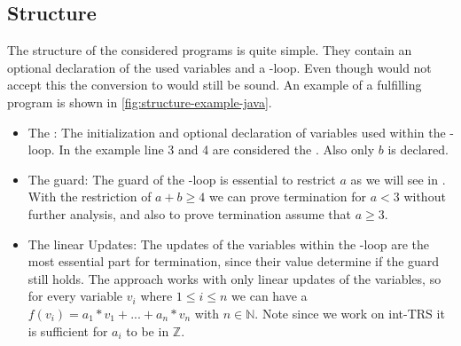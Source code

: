 \subsection{Structure}
\label{sec:structure}
The structure of the considered programs is quite simple. They contain an optional declaration of the used variables and a -loop. Even though  would not accept this the conversion to  would still be sound. An example of a fulfilling  program is shown in \autoref{fig:structure-example-java}. 
\begin{itemize}
	\item The \stem: \newline
		The initialization and optional declaration of variables used within the -loop. In the example line 3 and 4 are considered the \stem. Also only $b$ is declared.
	\item The guard: \newline
		The guard of the -loop is essential to restrict $a$  as we will see in %
		. With the restriction of $a+b\ge 4 $ we can prove termination for $a < 3$ without further analysis, and also to prove termination assume that $a \ge 3$.
	\item The linear Updates: \newline
		The updates of the variables within the -loop are the most essential part for termination, since their value determine if the guard still holds. The approach works with only linear updates of the variables, so for every variable $v_i$ where $1\le i\le n$ we can have a $f(v_i)=a_1*v_1+...+a_n*v_n$ with $n \in \mathbb{N}$. Note since we work on int-TRS it is sufficient for $a_i$ to be in $\mathbb{Z}$. 	
\end{itemize} 

